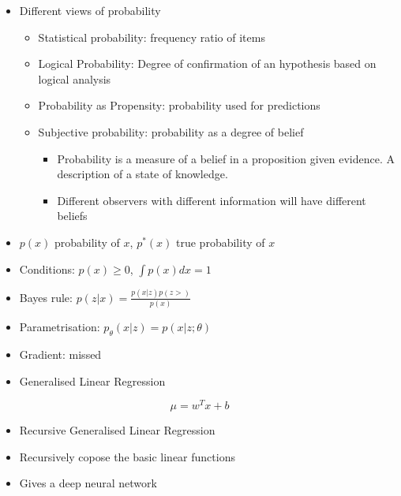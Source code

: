 \documentclass[b5paper]{report}
\begin{document}
\begin{itemize}
  \item Different views of probability
    \begin{itemize}
      \item Statistical probability: frequency ratio of items
      \item Logical Probability: Degree of confirmation of an hypothesis
          based on logical analysis
      \item Probability as Propensity: probability used for predictions
      \item Subjective probability: probability as a degree of belief
        \begin{itemize}
          \item Probability is a measure of a belief in a proposition given
            evidence. A description of a state of knowledge.
          \item Different observers with different information will have
            different beliefs
        \end{itemize}
    \end{itemize}
  \item $p(x)$ probability of $x$, $p^*(x)$ true probability of $x$
  \item Conditions: $p(x) \ge 0$, $\int p(x) dx = 1$
  \item Bayes rule: $p(z|x) = \frac{p(x|z)p(z>)}{p(x)}$
  \item Parametrisation: $p_\theta(x|z) = p(x|z; \theta)$
  \item Gradient: missed
\end{itemize}

\begin{itemize}
  \item Generalised Linear Regression
\end{itemize}

\begin{equation}
  \mu = w^T x + b
\end{equation}

\begin{itemize}
  \item Recursive Generalised Linear Regression
  \item Recursively copose the basic linear functions
  \item Gives a deep neural network
\end{itemize}
\end{document}

